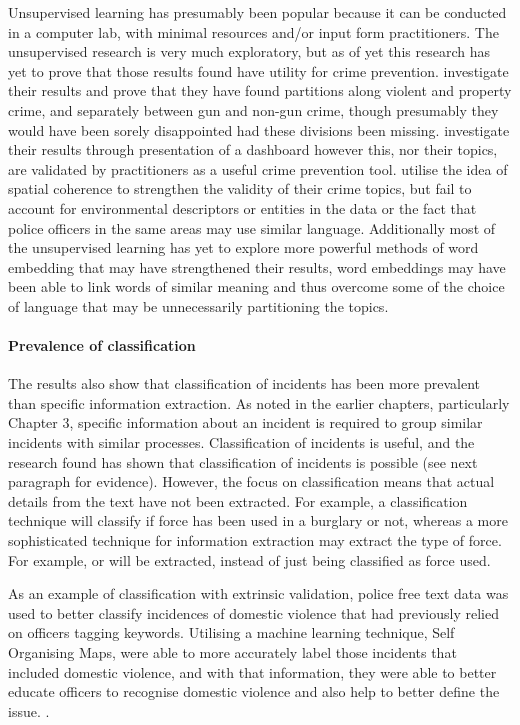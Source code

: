 Unsupervised learning has presumably been popular because it can be conducted in a computer lab, with minimal resources and/or input form practitioners. The unsupervised research is very much exploratory, but as of yet this research has yet to prove that those results found have utility for crime prevention. \textcite{kuang2017crime}  investigate their results and prove that they have found partitions along violent and property crime, and separately between gun and non-gun crime, though presumably they would have been sorely disappointed had these divisions been missing. \textcite{birks2020unsupervised}  investigate their results through presentation of a dashboard however this, nor their topics, are validated by practitioners as a useful crime prevention tool.  \textcite{Pandey201876} utilise the idea of spatial coherence to strengthen the validity of their crime topics, but fail to account for environmental descriptors or entities in the data or the fact that police officers in the same areas may use similar language. Additionally most of the unsupervised learning has yet to explore more powerful methods of word embedding that may have strengthened their results, word embeddings may have been able to link words of  similar meaning and thus overcome some of the choice of language that may be unnecessarily partitioning the topics.


\paragraph{Prevalence of classification}

The results also show that classification of incidents has been more prevalent than specific information extraction. As noted in the earlier chapters, particularly Chapter 3, specific information about an incident is required to group similar incidents with similar processes. Classification of incidents is useful, and the research found has shown that classification of incidents is possible (see next paragraph for evidence). However, the focus on classification means that actual details from the text have not been extracted. For example, a classification technique will classify if force has been used in a burglary or not, whereas a more sophisticated technique for information extraction may extract the type of force. For example,  or  will be extracted, instead of just being classified as force used.

As an example of classification with extrinsic validation, police free text data was used to better classify incidences of domestic violence that had previously relied on officers tagging keywords. Utilising a machine learning technique, Self Organising Maps, \parencite{Poelmans200911864} were able to more accurately label those incidents that included domestic violence, and with that information, they were able to better educate officers to recognise domestic violence and also help to better define the issue.  \parencite{ Poelmans2009247, Poelmans20113870, Poelmans200911864}.


